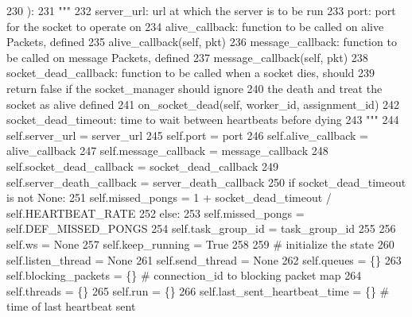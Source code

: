 \begin{DoxyCode}
230     ):
231         \textcolor{stringliteral}{"""}
232 \textcolor{stringliteral}{        server\_url:           url at which the server is to be run}
233 \textcolor{stringliteral}{        port:                 port for the socket to operate on}
234 \textcolor{stringliteral}{        alive\_callback:       function to be called on alive Packets, defined}
235 \textcolor{stringliteral}{                               alive\_callback(self, pkt)}
236 \textcolor{stringliteral}{        message\_callback:     function to be called on message Packets, defined}
237 \textcolor{stringliteral}{                               message\_callback(self, pkt)}
238 \textcolor{stringliteral}{        socket\_dead\_callback: function to be called when a socket dies, should}
239 \textcolor{stringliteral}{                              return false if the socket\_manager should ignore}
240 \textcolor{stringliteral}{                              the death and treat the socket as alive defined}
241 \textcolor{stringliteral}{                               on\_socket\_dead(self, worker\_id, assignment\_id)}
242 \textcolor{stringliteral}{        socket\_dead\_timeout:  time to wait between heartbeats before dying}
243 \textcolor{stringliteral}{        """}
244         self.server\_url = server\_url
245         self.port = port
246         self.alive\_callback = alive\_callback
247         self.message\_callback = message\_callback
248         self.socket\_dead\_callback = socket\_dead\_callback
249         self.server\_death\_callback = server\_death\_callback
250         \textcolor{keywordflow}{if} socket\_dead\_timeout \textcolor{keywordflow}{is} \textcolor{keywordflow}{not} \textcolor{keywordtype}{None}:
251             self.missed\_pongs = 1 + socket\_dead\_timeout / self.HEARTBEAT\_RATE
252         \textcolor{keywordflow}{else}:
253             self.missed\_pongs = self.DEF\_MISSED\_PONGS
254         self.task\_group\_id = task\_group\_id
255 
256         self.ws = \textcolor{keywordtype}{None}
257         self.keep\_running = \textcolor{keyword}{True}
258 
259         \textcolor{comment}{# initialize the state}
260         self.listen\_thread = \textcolor{keywordtype}{None}
261         self.send\_thread = \textcolor{keywordtype}{None}
262         self.queues = \{\}
263         self.blocking\_packets = \{\}  \textcolor{comment}{# connection\_id to blocking packet map}
264         self.threads = \{\}
265         self.run = \{\}
266         self.last\_sent\_heartbeat\_time = \{\}  \textcolor{comment}{# time of last heartbeat sent}

\end{DoxyCode}
